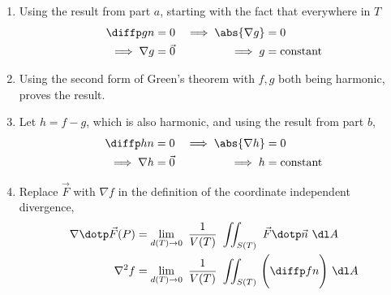 \begin{enumerate}
\begin{enumerate}
              \item Using the result from part $ a $,
                    starting with the fact that everywhere in $ T $
                    \begin{align}
                        \diffp gn               & = 0               &
                        \implies \abs{\nabla g} & = 0                 \\
                        \implies \nabla g       & = \vec{0}         &
                        \implies g              & = \text{constant}
                    \end{align}
              \item Using the second form of Green's theorem with $ f, g $ both being
                    harmonic, proves the result.
              \item Let $ h = f - g $, which is also harmonic, and using the result from
                    part $ b $,
                    \begin{align}
                        \diffp hn               & = 0               &
                        \implies \abs{\nabla h} & = 0                 \\
                        \implies \nabla h       & = \vec{0}         &
                        \implies h              & = \text{constant}
                    \end{align}
              \item Replace $ \vec{F} $ with $ \nabla f $ in the definition of the
                    coordinate independent divergence,
                    \begin{align}
                        \nabla \dotp \vec{F}(P) & = \lim_{d(T) \rightarrow 0}
                        \ \frac{1}{V(T)}\ \iint_{S(T)}\ \vec{F} \dotp \vec{n}\ \dl A \\
                        \nabla^2 f              & = \lim_{d(T) \rightarrow 0}
                        \ \frac{1}{V(T)}\ \iint_{S(T)}\ \Biggl( \diffp fn
                        \Biggr)\ \dl A
                    \end{align}
          \end{enumerate}
\end{enumerate}